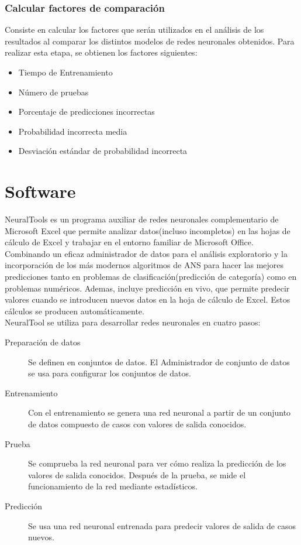\documentclass[11pt,titlepage]{report}
\begin{document}
\subsubsection{Calcular factores de comparación}
Consiste en calcular los factores que serán utilizados en el análisis de los resultados al comparar los distintos modelos de redes neuronales obtenidos. Para realizar esta etapa, se obtienen los factores siguientes: 
\begin{itemize}
	\item Tiempo de Entrenamiento
    \item Número de pruebas
	\item Porcentaje de predicciones incorrectas
	\item Probabilidad incorrecta media
	\item Desviación estándar de probabilidad incorrecta
\end{itemize}
\section{Software} \label{SF}
NeuralTools es un programa auxiliar de redes neuronales complementario de Microsoft Excel que permite analizar datos(incluso incompletos) en las hojas de cálculo de Excel y trabajar en el entorno familiar de Microsoft Office. Combinando un eficaz administrador de datos para el análisis exploratorio y la incorporación de los más modernos algoritmos de ANS para hacer las mejores predicciones tanto en problemas de clasificación(predicción de categoría) como en problemas numéricos. Ademas, incluye predicción en vivo, que permite predecir valores cuando se introducen nuevos datos en la hoja de cálculo de Excel. Estos cálculos se producen automáticamente.\\

NeuralTool se utiliza para desarrollar redes neuronales en cuatro pasos: \cite{Guia17}
\begin{description}

\item[Preparación de datos] Se definen en conjuntos de datos. El Administrador de
conjunto de datos se usa para configurar los conjuntos de datos.

\item[Entrenamiento] Con el entrenamiento se genera una red neuronal a partir de un conjunto de datos compuesto de casos con valores de salida conocidos. 

\item[Prueba] Se comprueba la red neuronal para ver cómo realiza la predicción de los valores de salida conocidos. Después de la prueba, se mide el funcionamiento de la red mediante estadísticos.

\item[Predicción] Se usa una red neuronal entrenada para predecir valores de salida  de casos nuevos.
\end{description}
\end{document}
